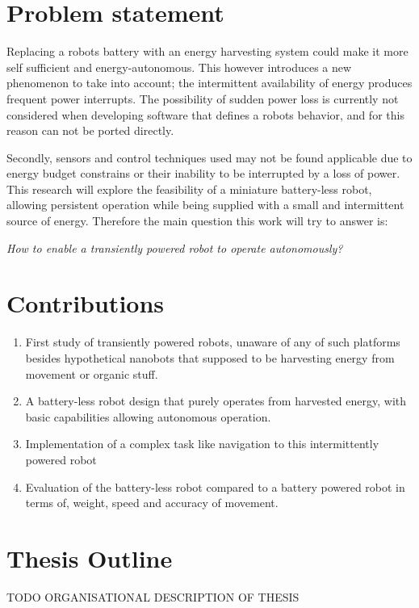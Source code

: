 \newpage

\section{Problem statement}



Replacing a robots battery with an energy harvesting system could make it more self sufficient and energy-autonomous. 
This however introduces a new phenomenon to take into account; the intermittent availability of energy produces frequent power interrupts.
The possibility of sudden power loss is currently not considered when developing software that defines a robots behavior, and for this reason can not be ported directly.
\hfill \break

Secondly, sensors and control techniques used may not be found applicable due to energy budget constrains or their inability to be interrupted by a loss of power. 
This research will explore the feasibility of a miniature battery-less robot, allowing persistent operation while being supplied with a small and intermittent source of energy.
Therefore the main question this work will try to answer is:

\begin{center}
	\textit{How to enable a transiently powered robot to operate autonomously?}
\end{center}

\section{Contributions}

\begin{enumerate}

\item First study of transiently powered robots, unaware of any of such platforms besides hypothetical nanobots that supposed to be harvesting energy from movement or organic stuff.

\item A battery-less robot design that purely operates from harvested energy, with basic capabilities allowing autonomous operation.

\item Implementation of a complex task like navigation to this intermittently powered robot

\item Evaluation of the battery-less robot compared to a battery powered robot in terms of, weight, speed and accuracy of movement.

% 

\end{enumerate}


\section{Thesis Outline}


\vspace{1\baselineskip}

\noindent
TODO ORGANISATIONAL DESCRIPTION OF THESIS


